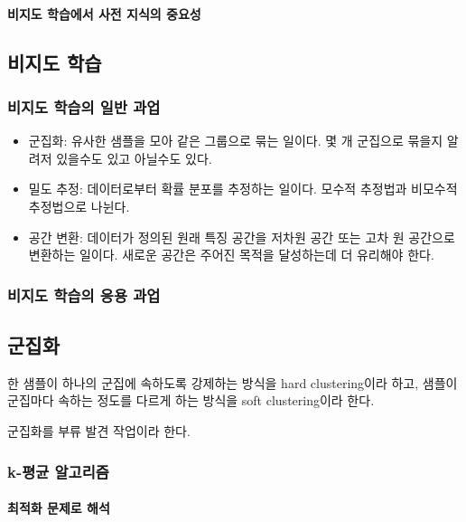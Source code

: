 \documentclass [12pt] {oblivoir}
\let\oldsubsubsection=\subsubsection
\renewcommand{\subsubsection}
{
  \filbreak
  \oldsubsubsection
}
\begin{document}
\paragraph*{비지도 학습에서 사전 지식의 중요성}\mbox{}

\vspace{3mm}

\subsection{비지도 학습}

\subsubsection{비지도 학습의 일반 과업}

\begin{itemize}
  \item 군집화: 유사한 샘플을 모아 같은 그룹으로 묶는 일이다. 몇 개 군집으로 묶을지 알려저 있을수도 있고 아닐수도 있다.
  \item 밀도 추정: 데이터로부터 확률 분포를 추정하는 일이다. 모수적 추정법과 비모수적 추정법으로 나뉜다.
  \item 공간 변환: 데이터가 정의된 원래 특징 공간을 저차원 공간 또는 고차 원 공간으로 변환하는 일이다. 새로운 공간은 주어진 목적을 달성하는데 더 유리해야 한다.
\end{itemize}

\subsubsection{비지도 학습의 응용 과업}

\subsection{군집화}

한 샘플이 하나의 군집에 속하도록 강제하는 방식을 hard clustering이라 하고, 샘플이 군집마다 속하는 정도를 다르게 하는 방식을 soft clustering이라 한다.

군집화를 부류 발견 작업이라 한다.

\subsubsection{k-평균 알고리즘}

\paragraph*{최적화 문제로 해석}\mbox{}
\end{document}
